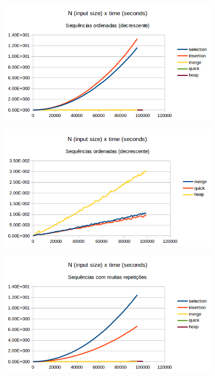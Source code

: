 \documentclass[11pt,a4paper]{article}
\begin{document}
\begin{figure}[]
  \begin{center}
      \includegraphics[width=1\textwidth]{sorted_down}
  \end{center}
      \label{fig:e}
\end{figure}


\begin{figure}[]
  \begin{center}
      \includegraphics[width=1\textwidth]{sorted_down_zoom}
  \end{center}
      \label{fig:f}
\end{figure}

\begin{figure}[]
  \begin{center}
      \includegraphics[width=1\textwidth]{lotrept}
  \end{center}
      \label{fig:g}
\end{figure}
\end{document}
